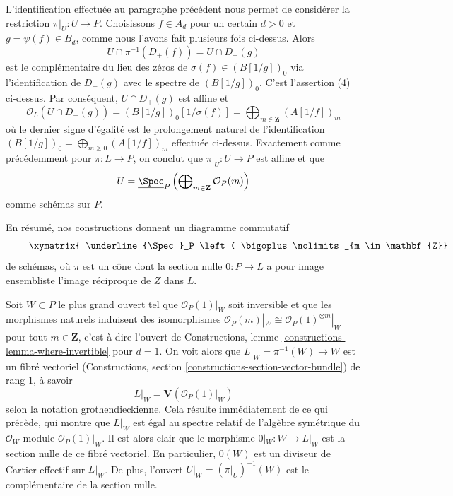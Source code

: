 \medskip\noindent
L'identification effectuée au paragraphe précédent nous permet de
considérer la restriction $\pi|_U : U \to P$. Choisissons
$f \in A_d$ pour un certain $d > 0$ et $g = \psi(f) \in B_d$,
comme nous l'avons fait plusieurs fois ci-dessus. Alors
$$
U \cap \pi^{-1}(D_+(f)) = U \cap D_+(g)
$$
est le complémentaire du lieu des zéros de $\sigma(f) \in (B[1/g])_0$
via l'identification de $D_+(g)$ avec le spectre de $(B[1/g])_0$.
C'est l'assertion (4) ci-dessus. Par conséquent,
$U \cap D_+(g)$ est affine et
$$
\mathcal{O}_L(U \cap D_+(g)) = (B[1/g])_0[1/\sigma(f)] =
\bigoplus\nolimits_{m \in \mathbf{Z}} (A[1/f])_m
$$
où le dernier signe d'égalité est le prolongement naturel de
l'identification $(B[1/g])_0 = \bigoplus_{m \geq 0} (A[1/f])_m$
effectuée ci-dessus. Exactement comme précédemment pour $\pi : L \to P$,
on conclut que $\pi|_U : U \to P$ est affine et que
$$
U = \underline{\Spec}_P
\left(
\bigoplus\nolimits_{m \in \mathbf{Z}} \mathcal{O}_P(m)
\right)
$$
comme schémas sur $P$.

\medskip\noindent
En résumé, nos constructions donnent un diagramme commutatif
\begin{equation}
\label{equation-proj-and-spec}
\vcenter{
\xymatrix{
\underline{\Spec}_P \left(
\bigoplus\nolimits_{m \in \mathbf{Z}} \mathcal{O}_P(m)
\right)
\ar[r] \ar@{=}[d] &
L =
\underline{\Spec}_P \left(
\bigoplus\nolimits_{m \geq 0} \mathcal{O}_P(m)
\right) \ar[d]^\sigma \ar[r]_-\pi & P \ar[d] \\
U \ar[r] & X \ar[r] & Z
}
}
\end{equation}
de schémas, où $\pi$ est un cône dont la section nulle $0 : P \to L$
a pour image ensembliste l'image réciproque de $Z$ dans $L$.

\medskip\noindent
Soit $W \subset P$ le plus grand ouvert tel que $\mathcal{O}_P(1)|_W$
soit inversible et que les morphismes naturels induisent des isomorphismes
$\mathcal{O}_P(m)|_W \cong \mathcal{O}_P(1)^{\otimes m}|_W$
pour tout $m \in \mathbf{Z}$, c'est-à-dire l'ouvert de
Constructions, lemme \ref{constructions-lemma-where-invertible} pour $d = 1$.
On voit alors que $L|_W = \pi^{-1}(W) \to W$ est un fibré vectoriel
(Constructions, section \ref{constructions-section-vector-bundle})
de rang $1$, à savoir
$$
L|_W = \mathbf{V}(\mathcal{O}_P(1)|_W)
$$
selon la notation grothendieckienne. Cela résulte immédiatement de ce qui précède, qui montre
que $L|_W$ est égal au spectre relatif de l'algèbre symétrique du
$\mathcal{O}_W$-module $\mathcal{O}_P(1)|_W$. Il est alors clair que le
morphisme $0|_W : W \to L|_W$ est la section nulle de ce
fibré vectoriel. En particulier, $0(W)$ est un diviseur de Cartier effectif
sur $L|_W$. De plus, l'ouvert $U|_W = (\pi|_U)^{-1}(W)$
est le complémentaire de la section nulle.

